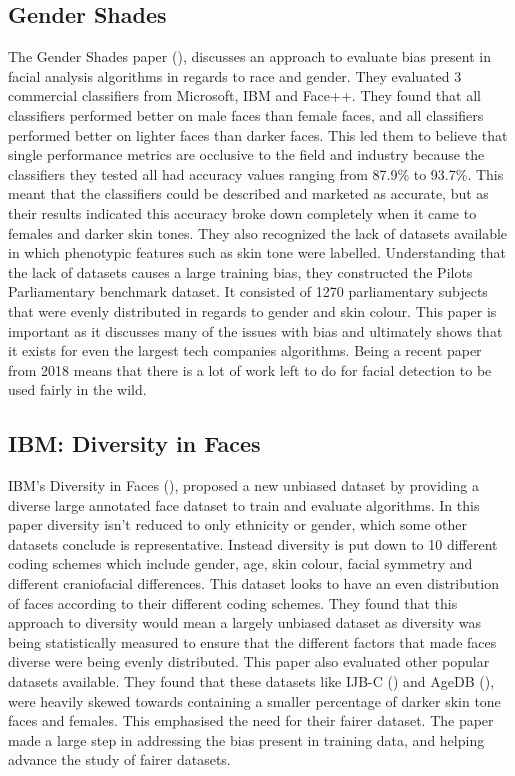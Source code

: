 \documentclass{l4proj}
\begin{document}
\subsection{Gender Shades}
The Gender Shades paper (\cite{gendershades}), discusses an approach to evaluate bias present in facial analysis algorithms in regards to race and gender. They evaluated 3 commercial classifiers from Microsoft, IBM and Face++. They found that all classifiers performed better on male faces than female faces, and all classifiers performed better on lighter faces than darker faces. This led them to believe that single performance metrics are occlusive to the field and industry because the classifiers they tested all had accuracy values ranging from 87.9\% to 93.7\%. This meant that the classifiers could be described and marketed as accurate, but as their results indicated this accuracy broke down completely when it came to females and darker skin tones. They also recognized the lack of datasets available in which phenotypic features such as skin tone were labelled. Understanding that the lack of datasets causes a large training bias, they constructed the Pilots Parliamentary benchmark dataset. It consisted of 1270 parliamentary subjects that were evenly distributed in regards to gender and skin colour. This paper is important as it discusses many of the issues with bias and ultimately shows that it exists for even the largest tech companies algorithms. Being a recent paper from 2018 means that there is a lot of work left to do for facial detection to be used fairly in the wild.
\subsection{IBM: Diversity in Faces}
IBM's Diversity in Faces (\cite{dif}), proposed a new unbiased dataset by providing a diverse large annotated face dataset to train and evaluate algorithms. In this paper diversity isn't reduced to only ethnicity or gender, which some other datasets conclude is representative. Instead diversity is put down to 10 different coding schemes which include gender, age, skin colour, facial symmetry and different craniofacial differences. This dataset looks to have an even distribution of faces according to their different coding schemes. They found that this approach to diversity would mean a largely unbiased dataset as diversity was being statistically measured to ensure that the different factors that made faces diverse were being evenly distributed. This paper also evaluated other popular datasets available. They found that these datasets like IJB-C (\cite{ijb-c}) and AgeDB (\cite{agedb}), were heavily skewed towards containing a smaller percentage of darker skin tone faces and females. This emphasised the need for their fairer dataset. The paper made a large step in addressing the bias present in training data, and helping advance the study of fairer datasets.
\end{document}
